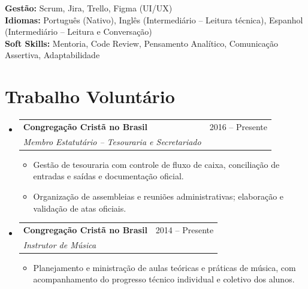 \documentclass[letterpaper,11pt]{article}
\makeatletter
\newcommand{\resumeItem}[1]{
    \item\small{
            {#1 \vspace{-2pt}}
    }
}
\newcommand{\resumeSubheading}[4]{
    \vspace{-2pt}\item
    \begin{tabular*}{0.97\textwidth}[t]{l@{\extracolsep{\fill}}r}
    \textbf{#1} & #2 \\
    \textit{\small#3} & \textit{\small #4} \\
    \end{tabular*}\vspace{-7pt}
}
\newcommand{\resumeSubHeadingListStart}{\begin{itemize}[leftmargin=0.15in, label={}]}
\newcommand{\resumeSubHeadingListEnd}{\end{itemize}}
\newcommand{\resumeItemListStart}{\begin{itemize}}
\newcommand{\resumeItemListEnd}{\end{itemize}\vspace{-5pt}}
\makeatother
\begin{document}
\begin{itemize}[leftmargin=0.15in, label={}]
{{\vspace{1mm}
\textbf{Gestão:} Scrum, Jira, Trello, Figma (UI/UX) \\
\vspace{1mm}
\textbf{Idiomas:} Português (Nativo), Inglês (Intermediário -- Leitura técnica), Espanhol (Intermediário -- Leitura e Conversação) \\
\vspace{1mm}
\textbf{Soft Skills:} Mentoria, Code Review, Pensamento Analítico, Comunicação Assertiva, Adaptabilidade \\
\vspace{1mm}
}}
\end{itemize}

\section{Trabalho Voluntário}
\resumeSubHeadingListStart
\resumeSubheading
{Congregação Cristã no Brasil}{2016 -- Presente}
{Membro Estatutário -- Tesouraria e Secretariado}{}
\resumeItemListStart
    \resumeItem{Gestão de tesouraria com controle de fluxo de caixa, conciliação de entradas e saídas e documentação oficial.}
    \resumeItem{Organização de assembleias e reuniões administrativas; elaboração e validação de atas oficiais.}
\resumeItemListEnd
\resumeSubheading
{Congregação Cristã no Brasil}{2014 -- Presente}
{Instrutor de Música}{}
\resumeItemListStart
    \resumeItem{Planejamento e ministração de aulas teóricas e práticas de música, com acompanhamento do progresso técnico individual e coletivo dos alunos.}
\resumeItemListEnd
\resumeSubHeadingListEnd
\end{document}
